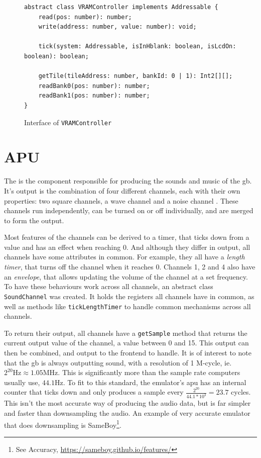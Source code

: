 \documentclass[11pt]{informatics-report}
\begin{document}
\begin{figure}[h]
    \begin{verbatim}
abstract class VRAMController implements Addressable {
    read(pos: number): number;
    write(address: number, value: number): void;

    tick(system: Addressable, isInHblank: boolean, isLcdOn: boolean): boolean;

    getTile(tileAddress: number, bankId: 0 | 1): Int2[][];
    readBank0(pos: number): number;
    readBank1(pos: number): number;
}
    \end{verbatim}
    \caption{Interface of \texttt{VRAMController}}
    \label{fig:vramcontroller-interface}
\end{figure}


\section{APU}

The  is the component responsible for producing the sounds and music of the \gls{gb}. It's output is the combination of four different channels, each with their own properties: two square channels, a wave channel and a noise channel \cite[Audio]{pandoc}. These channels run independently, can be turned on or off individually, and are merged to form the output.

 Most features of the channels can be derived to a timer, that ticks down from a value and has an effect when reaching 0. And although they differ in output, all channels have some attributes in common. For example, they all have a \textit{length timer}, that turns off the channel when it reaches 0. Channels 1, 2 and 4 also have an \textit{envelope}, that allows updating the volume of the channel at a set frequency. To have these behaviours work across all channels, an abstract class \texttt{SoundChannel} was created. It holds the registers all channels have in common, as well as methods like \texttt{tickLengthTimer} to handle common mechanisms across all channels.

To return their output, all channels have a \texttt{getSample} method that returns the current output value of the channel, a value between 0 and 15. This output can then be combined, and output to the frontend to handle. It is of interest to note that the \gls{gb} is always outputting sound, with a resolution of 1 M-cycle, ie. $2^{20}\text{Hz} \approx 1.05\text{MHz}$. This is significantly more than the sample rate computers usually use, $44.1\text{Hz}$. To fit to this standard, the emulator's \gls{apu} has an internal counter that ticks down and only produces a sample every $\frac{2^20}{44.1*10^3}=23.7$ cycles. This isn't the most accurate way of producing the audio data, but is far simpler and faster than downsampling the audio. An example of very accurate emulator that does downsampling is SameBoy\footnote{See Accuracy, \url{https://sameboy.github.io/features/}}.
\end{document}
